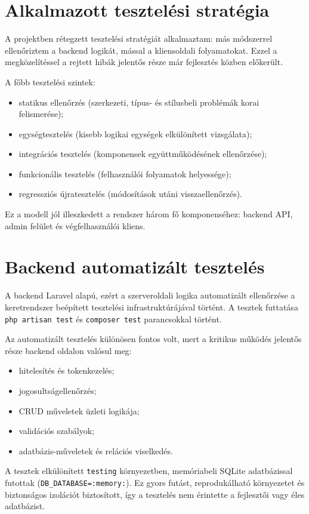 \documentclass{thesis-ekf}
\begin{document}
\section{Alkalmazott tesztelési stratégia}
A projektben rétegzett tesztelési stratégiát alkalmaztam: más módszerrel ellenőriztem a backend logikát, mással a kliensoldali folyamatokat. Ezzel a megközelítéssel a rejtett hibák jelentős része már fejlesztés közben előkerült.

A főbb tesztelési szintek:
\begin{itemize}
  \item statikus ellenőrzés (szerkezeti, típus- és stílusbeli problémák korai felismerése);
  \item egységtesztelés (kisebb logikai egységek elkülönített vizsgálata);
  \item integrációs tesztelés (komponensek együttműködésének ellenőrzése);
  \item funkcionális tesztelés (felhasználói folyamatok helyessége);
  \item regressziós újratesztelés (módosítások utáni visszaellenőrzés).
\end{itemize}

Ez a modell jól illeszkedett a rendszer három fő komponenséhez: backend API, admin felület és végfelhasználói kliens.

\section{Backend automatizált tesztelés}
A backend Laravel alapú, ezért a szerveroldali logika automatizált ellenőrzése a keretrendszer beépített tesztelési infrastruktúrájával történt. A tesztek futtatása \texttt{php artisan test} és \texttt{composer test} parancsokkal történt.

Az automatizált tesztelés különösen fontos volt, mert a kritikus működés jelentős része backend oldalon valósul meg:
\begin{itemize}
  \item hitelesítés és tokenkezelés;
  \item jogosultságellenőrzés;
  \item CRUD műveletek üzleti logikája;
  \item validációs szabályok;
  \item adatbázis-műveletek és relációs viselkedés.
\end{itemize}

A tesztek elkülönített \texttt{testing} környezetben, memóriabeli SQLite adatbázissal futottak (\texttt{DB\_DATABASE=:memory:}). Ez gyors futást, reprodukálható környezetet és biztonságos izolációt biztosított, így a tesztelés nem érintette a fejlesztői vagy éles adatbázist.
\end{document}

